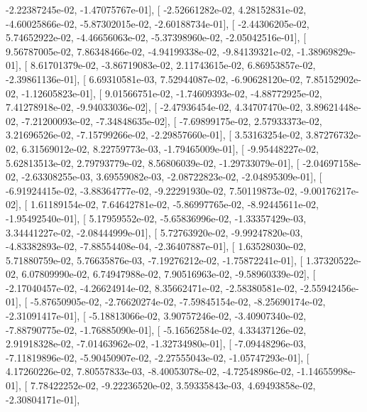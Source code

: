 \documentclass{article}
\begin{document}
         -2.22387245e-02,  -1.47075767e-01],
       [ -2.52661282e-02,   4.28152831e-02,  -4.60025866e-02,
         -5.87302015e-02,  -2.60188734e-01],
       [ -2.44306205e-02,   5.74652922e-02,  -4.46656063e-02,
         -5.37398960e-02,  -2.05042516e-01],
       [  9.56787005e-02,   7.86348466e-02,  -4.94199338e-02,
         -9.84139321e-02,  -1.38969829e-01],
       [  8.61701379e-02,  -3.86719083e-02,   2.11743615e-02,
          6.86953857e-02,  -2.39861136e-01],
       [  6.69310581e-03,   7.52944087e-02,  -6.90628120e-02,
          7.85152902e-02,  -1.12605823e-01],
       [  9.01566751e-02,  -1.74609393e-02,  -4.88772925e-02,
          7.41278918e-02,  -9.94033036e-02],
       [ -2.47936454e-02,   4.34707470e-02,   3.89621448e-02,
         -7.21200093e-02,  -7.34848635e-02],
       [ -7.69899175e-02,   2.57933373e-02,   3.21696526e-02,
         -7.15799266e-02,  -2.29857660e-01],
       [  3.53163254e-02,   3.87276732e-02,   6.31569012e-02,
          8.22759773e-03,  -1.79465009e-01],
       [ -9.95448227e-02,   5.62813513e-02,   2.79793779e-02,
          8.56806039e-02,  -1.29733079e-01],
       [ -2.04697158e-02,  -2.63308255e-03,   3.69559082e-03,
         -2.08722823e-02,  -2.04895309e-01],
       [ -6.91924415e-02,  -3.88364777e-02,  -9.22291930e-02,
          7.50119873e-02,  -9.00176217e-02],
       [  1.61189154e-02,   7.64642781e-02,  -5.86997765e-02,
         -8.92445611e-02,  -1.95492540e-01],
       [  5.17959552e-02,  -5.65836996e-02,  -1.33357429e-03,
          3.34441227e-02,  -2.08444999e-01],
       [  5.72763920e-02,  -9.99247820e-03,  -4.83382893e-02,
         -7.88554408e-04,  -2.36407887e-01],
       [  1.63528030e-02,   5.71880759e-02,   5.76635876e-03,
         -7.19276212e-02,  -1.75872241e-01],
       [  1.37320522e-02,   6.07809990e-02,   6.74947988e-02,
          7.90516963e-02,  -9.58960339e-02],
       [ -2.17040457e-02,  -4.26624914e-02,   8.35662471e-02,
         -2.58380581e-02,  -2.55942456e-01],
       [ -5.87650905e-02,  -2.76620274e-02,  -7.59845154e-02,
         -8.25690174e-02,  -2.31091417e-01],
       [ -5.18813066e-02,   3.90757246e-02,  -3.40907340e-02,
         -7.88790775e-02,  -1.76885090e-01],
       [ -5.16562584e-02,   4.33437126e-02,   2.91918328e-02,
         -7.01463962e-02,  -1.32734980e-01],
       [ -7.09448296e-03,  -7.11819896e-02,  -5.90450907e-02,
         -2.27555043e-02,  -1.05747293e-01],
       [  4.17260226e-02,   7.80557833e-03,  -8.40053078e-02,
         -4.72548986e-02,  -1.14655998e-01],
       [  7.78422252e-02,  -9.22236520e-02,   3.59335843e-03,
          4.69493858e-02,  -2.30804171e-01],
\end{document}
